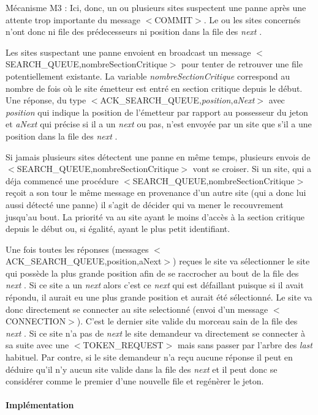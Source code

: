 \documentclass[a4paper,12pt]{article}
\newcommand{\last}{\textit{last} }
\newcommand{\next}{\textit{next} }
\begin{document}
Mécanisme M3 : Ici, donc, un ou plusieurs sites suspectent une panne après une attente trop importante du message $<$COMMIT$>$. Le ou les sites concernés n'ont donc ni file des prédecesseurs ni position dans la file des \next. 

Les sites suspectant une panne envoient en broadcast un message $<$SEARCH\_QUEUE,nombreSectionCritique$>$ pour tenter de retrouver une file potentiellement existante. La variable \textit{nombreSectionCritique} correspond au nombre de fois où le site émetteur est entré en section critique depuis le début. Une réponse, du type $<$ACK\_SEARCH\_QUEUE,\textit{position},\textit{aNext}$>$ avec \textit{position} qui indique la position de l'émetteur par rapport au possesseur du jeton et \textit{aNext} qui précise si il a un \next ou pas, n'est envoyée par un site que s'il a une position dans la file des \next. 

Si jamais plusieurs sites détectent une panne en même temps, plusieurs envois de $<$SEARCH\_QUEUE,nombreSectionCritique$>$ vont se croiser. Si un site, qui a déja commencé une procédure $<$SEARCH\_QUEUE,nombreSectionCritique$>$ reçoit a son tour le même message en provenance d'un autre site (qui a donc lui aussi détecté une panne) il s'agit de décider qui va mener le recouvrement jusqu'au bout. La priorité va au site ayant le moins d'accès à la section critique depuis le début ou, si égalité, ayant le plus petit identifiant.

Une fois toutes les réponses (messages $<$ACK\_SEARCH\_QUEUE,position,aNext$>$) reçues le site va sélectionner le site qui possède la plus grande position afin de se raccrocher au bout de la file des \next.
Si ce site a un \next alors c'est ce \next qui est défaillant puisque si il avait répondu, il aurait eu une plus grande position et aurait été sélectionné. Le site va donc directement se connecter au site selectionné (envoi d'un message $<$CONNECTION$>$). C'est le dernier site valide du morceau sain de la file des \next.
Si ce site n'a pas de \next le site demandeur va directement se connecter à sa suite avec une $<$TOKEN\_REQUEST$>$ mais sans passer par l'arbre des \last habituel.
Par contre, si le site demandeur n'a reçu aucune réponse il peut en déduire qu'il n'y aucun site valide dans la file des \next et il peut donc se considérer comme le premier d'une nouvelle file et regénèrer le jeton.



\paragraph{Implémentation}
\end{document}
